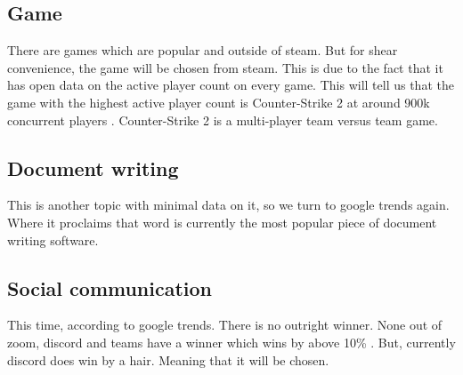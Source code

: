 \subsection{Game}
There are games which are popular and outside of steam. But for shear convenience, the game will be chosen from steam. This is due to the fact that it has open data on the active player count on every game. This will tell us that the game with the highest active player count is Counter-Strike 2 at around 900k concurrent players \cite{Steamdb1}. Counter-Strike 2 is a multi-player team versus team game.  

\subsection{Document writing}
This is another topic with minimal data on it, so we turn to google trends again. Where it proclaims \cite{Googletrend2} that word is currently the most popular piece of document writing software.

\subsection{Social communication}
This time, according to google trends. There is no outright winner. None out of zoom, discord and teams have a winner which wins by above 10\% \cite{Googletrend3}. But, currently discord does win by a hair. Meaning that it will be chosen.
